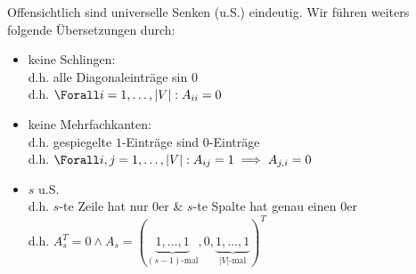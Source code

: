 \begin{solution}

\phantom{}


Offensichtlich sind universelle Senken (u.S.) eindeutig.
Wir führen weiters folgende Übersetzungen durch:

\begin{itemize}

  \item keine Schlingen: \\
  d.h. alle Diagonaleinträge sin $0$ \\
  d.h. $\Forall i = 1, \dots, |V|: A_{ii} = 0$

  \item keine Mehrfachkanten:\\
  d.h. gespiegelte $1$-Einträge sind $0$-Einträge \\
  d.h. $\Forall i, j = 1, \dots, |V|: A_{ij} = 1 \implies A_{j, i} = 0$

  \item $s$ u.S. \\
  d.h. $s$-te Zeile hat nur $0$er \& $s$-te Spalte hat genau einen $0$er \\
  d.h. $A_s^T = 0 \land  A_s = (\underbrace{1, \dots, 1}_{(s-1) \text{-mal}}, 0, \underbrace{1, \dots, 1}_{|V| \text{-mal}})^T$

\end{itemize}


\end{solution}
